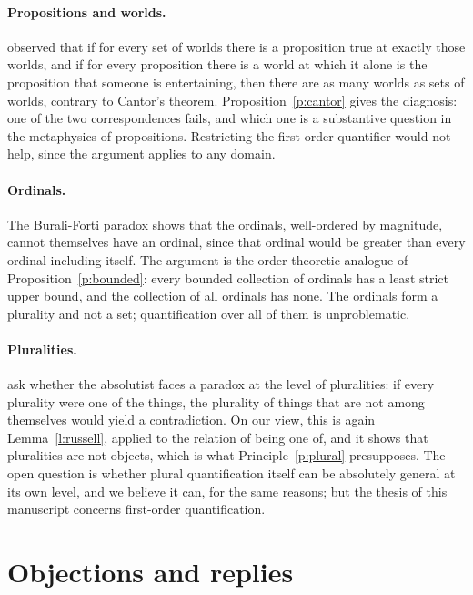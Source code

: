 \documentclass{situationist-preprint}
\begin{document}
\paragraph{Propositions and worlds.} \citet{Kaplan1995} observed that if for every set of worlds there is a proposition true at exactly those worlds, and if for every proposition there is a world at which it alone is the proposition that someone is entertaining, then there are as many worlds as sets of worlds, contrary to Cantor's theorem. Proposition~\ref{p:cantor} gives the diagnosis: one of the two correspondences fails, and which one is a substantive question in the metaphysics of propositions. Restricting the first-order quantifier would not help, since the argument applies to any domain.

\paragraph{Ordinals.} The Burali-Forti paradox \citep{BuraliForti1897} shows that the ordinals, well-ordered by magnitude, cannot themselves have an ordinal, since that ordinal would be greater than every ordinal including itself. The argument is the order-theoretic analogue of Proposition~\ref{p:bounded}: every bounded collection of ordinals has a least strict upper bound, and the collection of all ordinals has none. The ordinals form a plurality and not a set; quantification over all of them is unproblematic.

\paragraph{Pluralities.} \citet{FlorioLinnebo2021} ask whether the absolutist faces a paradox at the level of pluralities: if every plurality were one of the things, the plurality of things that are not among themselves would yield a contradiction. On our view, this is again Lemma~\ref{l:russell}, applied to the relation of being one of, and it shows that pluralities are not objects, which is what Principle~\ref{p:plural} presupposes. The open question is whether plural quantification itself can be absolutely general at its own level, and we believe it can, for the same reasons; but the thesis of this manuscript concerns first-order quantification.

\section{Objections and replies}\label{s:obj}
\end{document}

